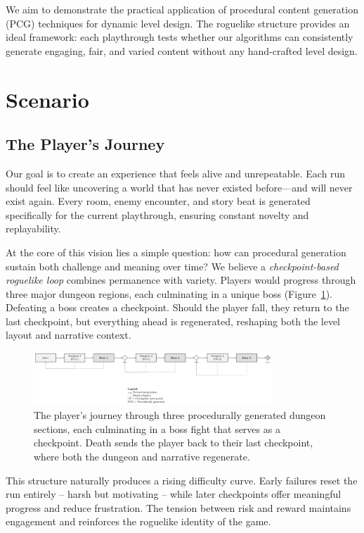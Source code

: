 \documentclass[11pt]{article}
\begin{document}
We aim to demonstrate the practical application of procedural content generation (PCG) techniques for dynamic level design. 
The roguelike structure provides an ideal framework: each playthrough tests whether our algorithms can consistently generate engaging, fair, and varied content without any hand-crafted level design.


\section{Scenario}
\label{sec:scenario}

\subsection{The Player's Journey}

Our goal is to create an experience that feels alive and unrepeatable. Each run should feel like uncovering a world that has never existed before—and will never exist again. Every room, enemy encounter, and story beat is generated specifically for the current playthrough, ensuring constant novelty and replayability. 

At the core of this vision lies a simple question: how can procedural generation sustain both challenge and meaning over time? We believe a \emph{checkpoint-based roguelike loop} combines permanence with variety. Players would progress through three major dungeon regions, each culminating in a unique boss (Figure~\ref{fig:game_flow}). Defeating a boss creates a checkpoint. 
Should the player fall, they return to the last checkpoint, but everything ahead is regenerated, reshaping both the level layout and narrative context. 

\begin{figure}[H]
    \centering
    \includegraphics[width=0.8\textwidth]{figures/game_flow.png}
    \caption{The player's journey through three procedurally generated dungeon sections, each culminating in a boss fight that serves as a checkpoint. Death sends the player back to their last checkpoint, where both the dungeon and narrative regenerate.}
    \label{fig:game_flow}
\end{figure}

This structure naturally produces a rising difficulty curve. 
Early failures reset the run entirely -- harsh but motivating -- while later checkpoints offer meaningful progress and reduce frustration. 
The tension between risk and reward maintains engagement and reinforces the roguelike identity of the game.
\end{document}
